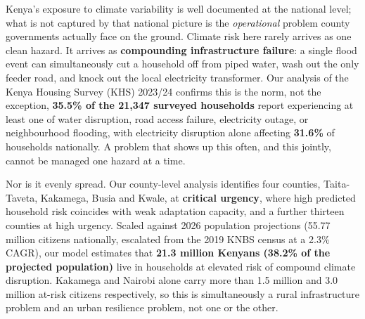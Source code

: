 \documentclass[12pt,a4paper]{article}
\begin{document}
Kenya's exposure to climate variability is well documented at the national level; what is not captured by that national picture is the \emph{operational} problem county governments actually face on the ground. Climate risk here rarely arrives as one clean hazard. It arrives as \textbf{compounding infrastructure failure}: a single flood event can simultaneously cut a household off from piped water, wash out the only feeder road, and knock out the local electricity transformer. Our analysis of the Kenya Housing Survey (KHS) 2023/24 confirms this is the norm, not the exception, \textbf{35.5\% of the 21,347 surveyed households} report experiencing at least one of water disruption, road access failure, electricity outage, or neighbourhood flooding, with electricity disruption alone affecting \textbf{31.6\%} of households nationally. A problem that shows up this often, and this jointly, cannot be managed one hazard at a time.

Nor is it evenly spread. Our county-level analysis identifies four counties, Taita-Taveta, Kakamega, Busia and Kwale, at \textbf{critical urgency}, where high predicted household risk coincides with weak adaptation capacity, and a further thirteen counties at high urgency. Scaled against 2026 population projections (55.77 million citizens nationally, escalated from the 2019 KNBS census at a 2.3\% CAGR), our model estimates that \textbf{21.3 million Kenyans (38.2\% of the projected population)} live in households at elevated risk of compound climate disruption. Kakamega and Nairobi alone carry more than 1.5 million and 3.0 million at-risk citizens respectively, so this is simultaneously a rural infrastructure problem and an urban resilience problem, not one or the other.
\end{document}
